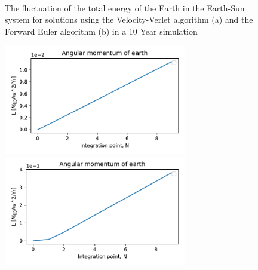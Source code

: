 \documentclass[10pt,showpacs,preprintnumbers,footinbib,amsmath,amssymb,aps,prl,twocolumn,groupedaddress,superscriptaddress,showkeys]{revtex4-1}
\begin{document}
\begin{figure}[h!]
  \center
  \\
   \caption{The fluctuation of the total energy of the Earth in the Earth-Sun system for solutions using the Velocity-Verlet algorithm (a) and the Forward Euler algorithm (b) in a 10 Year simulation}
   \label{fig:c_energy}
\end{figure}

\begin{figure}[h!tb]
  \center
  \includegraphics[width=8cm]{figs/ex_b_angularmomentum_velocityverlet_1.pdf}
  \includegraphics[width=8cm]{figs/ex_b_angularmomentum_eulerforward_1.pdf}
\end{figure}
\end{document}
